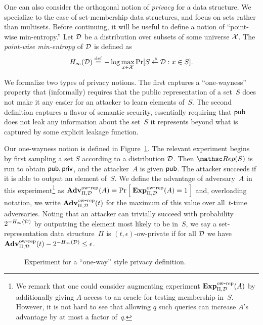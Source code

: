One can also consider the orthogonal notion of \emph{privacy} for a
data structure.
We specialize to the case of set-membership data structures, and
focus on sets rather than multisets.
Before continuing, it will be useful to define a notion of ``point-wise min-entropy.''
Let ${\cal D}$ be
a distribution over subsets of some universe ${\cal X}$. The \emph{point-wise
min-entropy} of ${\cal D}$ is defined as
\[H_\infty({\cal D}) \stackrel{\rm def}{=} -\log \max_{x \in {\cal X}} \Pr[S {\:\stackrel{{\scriptscriptstyle \hspace{0.2em}\$}} {\leftarrow}\:} {\cal D} : x \in S].\]



We formalize two types of privacy notions. The first captures
a ``one-wayness'' property that (informally) requires that
the public representation of a set~$S$ does not make it any easier for an attacker
to learn elements of~$S$.
The second definition
captures a flavor of semantic security, essentially requiring that ${\sf pub}$ does
not leak any information about the set~$S$ it represents beyond
what is captured by some explicit leakage function.

Our one-wayness notion is defined in Figure~\ref{fig:privacy-ow}.
The relevant experiment begins by first sampling a set $S$ according to a distribution
${\cal D}$. Then $\Rep(S)$ is run to obtain ${\sf pub},{\sf priv}$, and the attacker~$A$ is given
${\sf pub}$. The attacker succeeds if it is able to output an element of~$S$.
We define the advantage of adversary~$A$ in this experiment\footnote{We
remark that one could consider augmenting experiment $\mathrm{\mathbf{Exp}}^{\mathrm{ow\mbox{-}rep}}_{\Pi,{\cal D}}(A)$ by additionally
giving $A$ access to an oracle for testing membership in~$S$. However, it is not hard
to see that allowing $q$ such queries can increase $A$'s advantage by at most a factor of~$q$.} as
$\mathrm{\mathbf{Adv}}^{\mathrm{ow\mbox{-}rep}}_{\Pi,\mathcal{D}}(A) = \Pr\left[\: \mathrm{\mathbf{Exp}}^{\mathrm{ow\mbox{-}rep}}_{\Pi,{\cal D}}(A)=1 \:\right]$ and,
overloading notation, we write $\mathrm{\mathbf{Adv}}^{\mathrm{ow\mbox{-}rep}}_{\Pi,{\cal D}}(t)$ for the maximum of this value over
all~$t$-time adversaries.
Noting that an attacker can trivially succeed with probability
$2^{-H_\infty({\cal D})}$ by outputting the element most likely to be in~$S$,
we say a
set-representation data structure~$\Pi$ is $(t,\epsilon)$-ow-private if for all ${\cal D}$
we have $\mathrm{\mathbf{Adv}}^{\mathrm{ow\mbox{-}rep}}_{\Pi,{\cal D}}(t) - 2^{-H_\infty({\cal D})} \leq \epsilon$.

\begin{figure}[hbtp]
\centering
{}
\caption{Experiment for a ``one-way'' style privacy
  definition.}
\label{fig:privacy-ow}
\end{figure}


